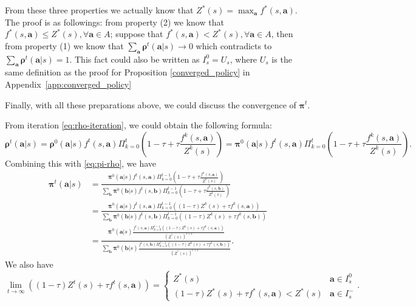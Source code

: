 \documentclass{article}
\begin{document}
     From these three properties we actually know that $Z^*(s) = \max_{\bm{a}}f^*(s,\bm{a})$. The proof is as followings: from property (2) we know that $f^*(s,\bm{a}) \le Z^*(s), \forall \bm{a} \in A$; suppose that  $f^*(s,\bm{a}) < Z^*(s), \forall \bm{a} \in A$, then from property (1) we know that $\sum_{\bm{a}} \bm{\rho}^t(\bm{a}|s) \to 0$ which contradicts to $\sum_{\bm{a}} \bm{\rho}^t(\bm{a}|s)  = 1$. This fact could also be written as $I^0_s = U_s$, where $U_s$ is the same definition as the proof for Proposition \ref{converged_policy} in Appendix~\ref{app:converged_policy}
     
     Finally, with all these preparations above, we could discuss the convergence of $\bm{\pi}^t$. 
     
     From iteration \eqref{eq:rho-iteration}, we could obtain the following formula:
     \begin{equation}
        \bm{\rho}^t(\bm{a}|s) = \bm{\rho}^0(\bm{a}|s)f^t(s,\bm{a}) \Pi_{k=0}^t \left(1-\tau + \tau \frac{f^k(s,\bm{a})}{Z^k(s)} \right) = \bm{\pi}^0(\bm{a}|s)f^t(s,\bm{a}) \Pi_{k=0}^t \left( 1-\tau + \tau \frac{f^k(s,\bm{a})}{Z^k(s)} \right). 
     \end{equation}
    Combining this with \eqref{eq:pi-rho}, we have
    \begin{align*}
        \bm{\pi}^t(\bm{a}|s) & = \frac{\bm{\pi}^0(\bm{a}|s)f^t(s,\bm{a}) \Pi_{k=0}^{t-1} \left( 1-\tau + \tau \frac{f^k(s,\bm{a})}{Z^k(s)} \right)}{\sum_{\bm{b}}\bm{\pi}^0(\bm{b}|s)f^t(s,\bm{b}) \Pi_{k=0}^{t-1} \left( 1-\tau + \tau \frac{f^k(s,\bm{b})}{Z^k(s)} \right)} \\
        & = \frac{\bm{\pi}^0(\bm{a}|s)f^t(s,\bm{a}) \Pi_{k=0}^{t-1} \left( (1-\tau) Z^k(s) + \tau f^k(s,\bm{a})\right)}{\sum_{\bm{b}}\bm{\pi}^0(\bm{b}|s)f^t(s,\bm{b}) \Pi_{k=0}^{t-1} \left( (1-\tau) Z^k(s) + \tau f^k(s,\bm{b}) \right)} \\
        & = \frac{\bm{\pi}^0(\bm{a}|s) \frac{f^t(s,\bm{a})\Pi_{k=0}^{t-1} \left( (1-\tau) Z^k(s) + \tau f^k(s,\bm{a})\right)}{\left( Z^*(s) \right)^{t+1}} }{\sum_{\bm{b}}\bm{\pi}^0(\bm{b}|s)\frac{f^t(s,\bm{b})\Pi_{k=0}^{t-1} \left( (1-\tau) Z^k(s) + \tau f^k(s,\bm{b})\right)}{\left( Z^*(s) \right)^{t+1}}}.
    \end{align*}
    We also have 
    \begin{equation}
        \lim_{t \to \infty}\left( (1-\tau)Z^t(s) + \tau f^t(s,\bm{a}) \right) = \begin{cases}
           Z^*(s) & \bm{a} \in I^0_s \\
           (1-\tau)Z^*(s) + \tau f^*(s,\bm{a}) < Z^*(s) & \bm{a} \in I^-_s
        \end{cases}.
    \end{equation}
\end{document}
